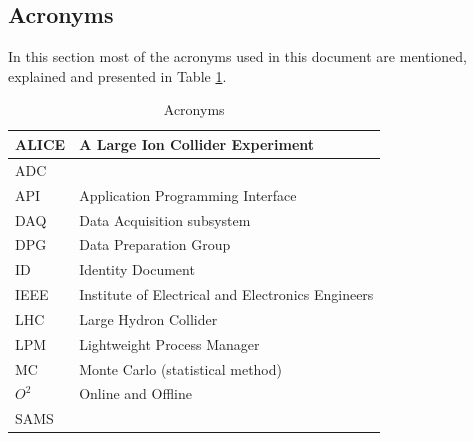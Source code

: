 \subsection{Acronyms} 
In this section most of the acronyms used in this document are mentioned, explained and presented in Table \ref{tab:acronyms}.
\begin{table}[h]
\begin{center}
\begin{longtable}{ll}
    \hline
    ALICE & A Large Ion Collider Experiment\\
    \hline
    ADC & \\
    \hline
    API & Application Programming Interface\\
    \hline
    DAQ & Data Acquisition subsystem \\
    \hline
    DPG & Data Preparation Group\\
    \hline
    ID & Identity Document\\
    \hline
    IEEE & Institute of Electrical and Electronics Engineers\\
    \hline
     LHC  & Large Hydron Collider\\
     \hline
     LPM & Lightweight Process Manager \\
     \hline
     MC & Monte Carlo (statistical method)\\
     \hline
     $O^2$ & Online and Offline\\
     \hline
     SAMS & \\
     \hline
    \end{longtable}
      \caption{Acronyms}
  \label{tab:acronyms}
  \end{center}
  
\end{table}


